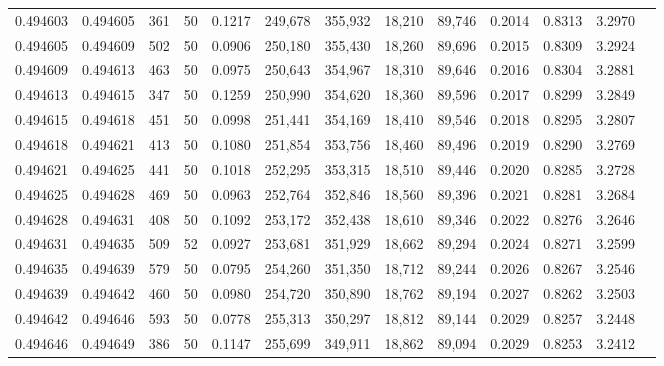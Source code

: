 \begin{tabular}{rrrrrrrrrrrrr}
0.494603 & 0.494605 &   361 &  50 &                                     0.1217 & 249,678 & 355,932 &  18,210 &  89,746 & 0.2014 & 0.8313 & 3.2970 \\
0.494605 & 0.494609 &   502 &  50 &                                     0.0906 & 250,180 & 355,430 &  18,260 &  89,696 & 0.2015 & 0.8309 & 3.2924 \\
0.494609 & 0.494613 &   463 &  50 &                                     0.0975 & 250,643 & 354,967 &  18,310 &  89,646 & 0.2016 & 0.8304 & 3.2881 \\
0.494613 & 0.494615 &   347 &  50 &                                     0.1259 & 250,990 & 354,620 &  18,360 &  89,596 & 0.2017 & 0.8299 & 3.2849 \\
0.494615 & 0.494618 &   451 &  50 &                                     0.0998 & 251,441 & 354,169 &  18,410 &  89,546 & 0.2018 & 0.8295 & 3.2807 \\
0.494618 & 0.494621 &   413 &  50 &                                     0.1080 & 251,854 & 353,756 &  18,460 &  89,496 & 0.2019 & 0.8290 & 3.2769 \\
0.494621 & 0.494625 &   441 &  50 &                                     0.1018 & 252,295 & 353,315 &  18,510 &  89,446 & 0.2020 & 0.8285 & 3.2728 \\
0.494625 & 0.494628 &   469 &  50 &                                     0.0963 & 252,764 & 352,846 &  18,560 &  89,396 & 0.2021 & 0.8281 & 3.2684 \\
0.494628 & 0.494631 &   408 &  50 &                                     0.1092 & 253,172 & 352,438 &  18,610 &  89,346 & 0.2022 & 0.8276 & 3.2646 \\
0.494631 & 0.494635 &   509 &  52 &                                     0.0927 & 253,681 & 351,929 &  18,662 &  89,294 & 0.2024 & 0.8271 & 3.2599 \\
0.494635 & 0.494639 &   579 &  50 &                                     0.0795 & 254,260 & 351,350 &  18,712 &  89,244 & 0.2026 & 0.8267 & 3.2546 \\
0.494639 & 0.494642 &   460 &  50 &                                     0.0980 & 254,720 & 350,890 &  18,762 &  89,194 & 0.2027 & 0.8262 & 3.2503 \\
0.494642 & 0.494646 &   593 &  50 &                                     0.0778 & 255,313 & 350,297 &  18,812 &  89,144 & 0.2029 & 0.8257 & 3.2448 \\
0.494646 & 0.494649 &   386 &  50 &                                     0.1147 & 255,699 & 349,911 &  18,862 &  89,094 & 0.2029 & 0.8253 & 3.2412 \\

\end{tabular}
